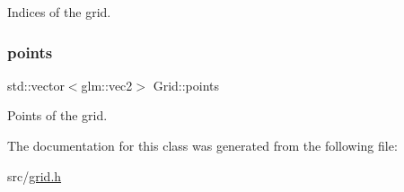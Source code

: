 Indices of the grid. 

\mbox{\label{classGrid_a1ecea5aa80e7ea89dbd980e07fdf94e4}} 
\subsubsection{\texorpdfstring{points}{points}}
{\footnotesize\ttfamily std\+::vector$<$glm\+::vec2$>$ Grid\+::points}



Points of the grid. 



The documentation for this class was generated from the following file\+:\begin{DoxyCompactItemize}
\item 
src/\hyperlink{grid_8h}{grid.\+h}\end{DoxyCompactItemize}
